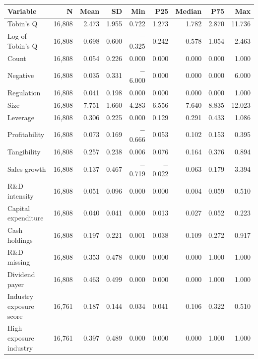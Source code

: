 \begin{tabular}{lrrrrrrrr}
\toprule
Variable & N & Mean & SD & Min & P25 & Median & P75 & Max \\
\midrule
Tobin's Q & 16,808 & 2.473 & 1.955 & 0.722 & 1.273 & 1.782 & 2.870 & 11.736 \\
Log of Tobin's Q & 16,808 & 0.698 & 0.600 & $-$0.325 & 0.242 & 0.578 & 1.054 & 2.463 \\
Count & 16,808 & 0.054 & 0.226 & 0.000 & 0.000 & 0.000 & 0.000 & 1.000 \\
Negative & 16,808 & 0.035 & 0.331 & $-$6.000 & 0.000 & 0.000 & 0.000 & 6.000 \\
Regulation & 16,808 & 0.041 & 0.198 & 0.000 & 0.000 & 0.000 & 0.000 & 1.000 \\
Size & 16,808 & 7.751 & 1.660 & 4.283 & 6.556 & 7.640 & 8.835 & 12.023 \\
Leverage & 16,808 & 0.306 & 0.225 & 0.000 & 0.129 & 0.291 & 0.433 & 1.086 \\
Profitability & 16,808 & 0.073 & 0.169 & $-$0.666 & 0.053 & 0.102 & 0.153 & 0.395 \\
Tangibility & 16,808 & 0.257 & 0.238 & 0.006 & 0.076 & 0.164 & 0.376 & 0.894 \\
Sales growth & 16,808 & 0.137 & 0.467 & $-$0.719 & $-$0.022 & 0.063 & 0.179 & 3.394 \\
R\&D intensity & 16,808 & 0.051 & 0.096 & 0.000 & 0.000 & 0.004 & 0.059 & 0.510 \\
Capital expenditure & 16,808 & 0.040 & 0.041 & 0.000 & 0.013 & 0.027 & 0.052 & 0.223 \\
Cash holdings & 16,808 & 0.197 & 0.221 & 0.001 & 0.038 & 0.109 & 0.272 & 0.917 \\
R\&D missing & 16,808 & 0.353 & 0.478 & 0.000 & 0.000 & 0.000 & 1.000 & 1.000 \\
Dividend payer & 16,808 & 0.463 & 0.499 & 0.000 & 0.000 & 0.000 & 1.000 & 1.000 \\
Industry exposure score & 16,761 & 0.187 & 0.144 & 0.034 & 0.041 & 0.106 & 0.322 & 0.510 \\
High exposure industry & 16,761 & 0.397 & 0.489 & 0.000 & 0.000 & 0.000 & 1.000 & 1.000 \\
\bottomrule
\end{tabular}
